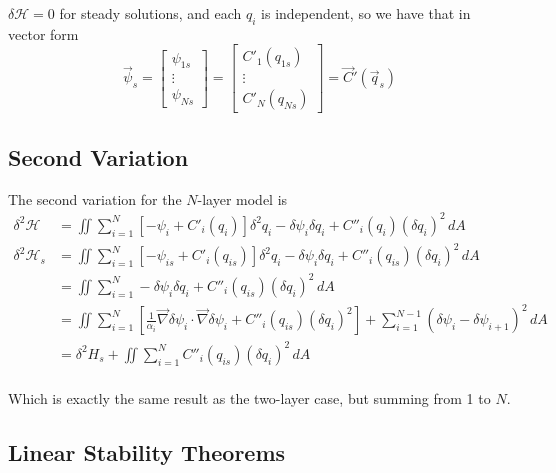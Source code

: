 \documentclass[12pt]{article}
\begin{document}
    $\delta \mathcal{H} = 0$ for steady solutions, and each $q_i$ is independent, so we have that in vector form
    \begin{equation}
      \vec \psi_s = 
      \left[\begin{array}{c}
        \psi_{1s} \\
        \vdots \\
        \psi_{Ns}
      \end{array}\right]
      =
      \left[\begin{array}{c}
        C'_1(q_{1s}) \\
        \vdots \\
        C'_N(q_{Ns})
      \end{array}\right]
      =
      \vec C'(\vec q_s)
    \end{equation}

  \subsection{Second Variation}
    The second variation for the $N$-layer model is
    \begin{align*}
      \delta^2 \mathcal{H} &= \iint \sum_{i=1}^N \left[ - \psi_i + C'_i(q_i) \right]  \delta^2 q_i  - \delta \psi_i \delta q_i +  C''_i(q_i) (\delta q_i)^2  \, dA \\
      \delta^2 \mathcal{H}_s &= \iint \sum_{i=1}^N \left[ - \psi_{is} + C'_i(q_{is}) \right]  \delta^2 q_i  - \delta \psi_i \delta q_i +  C''_i(q_{is}) (\delta q_i)^2  \, dA \\
       &= \iint \sum_{i=1}^N - \delta \psi_i \delta q_i +  C''_i(q_{is}) (\delta q_i)^2  \, dA \\
       &= \iint \sum_{i=1}^N \left[ \frac{1}{\alpha_i} \vec\nabla\delta\psi_i \cdot \vec\nabla\delta\psi_i + C''_i(q_{is}) (\delta q_i)^2 \right] + \sum_{i=1}^{N-1}(\delta\psi_i - \delta\psi_{i+1})^2 \, dA \\
       &= \delta^2 H_s + \iint \sum_{i=1}^N C''_i(q_{is})(\delta q_i)^2 \, dA \\
    \end{align*}

    Which is exactly the same result as the two-layer case, but summing from 1 to $N$.

  \subsection{Linear Stability Theorems}
\end{document}
